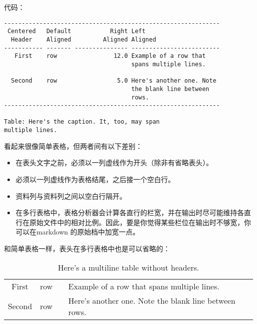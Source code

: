 \documentclass[fancyhdr,bookmark]{ctexbook}
\providecommand{\tightlist}{%
  \setlength{\itemsep}{0pt}\setlength{\parskip}{0pt}}
\begin{document}
代码：

\begin{lstlisting}
-------------------------------------------------------------
 Centered   Default           Right Left
  Header    Aligned         Aligned Aligned
----------- ------- --------------- -------------------------
   First    row                12.0 Example of a row that
                                    spans multiple lines.

  Second    row                 5.0 Here's another one. Note
                                    the blank line between
                                    rows.
-------------------------------------------------------------

Table: Here's the caption. It, too, may span
multiple lines.
\end{lstlisting}

看起来很像简单表格，但两者间有以下差别：

\begin{itemize}
\tightlist
\item
  在表头文字之前，必须以一列虚线作为开头（除非有省略表头）。
\item
  必须以一列虚线作为表格结尾，之后接一个空白行。
\item
  资料列与资料列之间以空白行隔开。
\item
  在多行表格中，表格分析器会计算各直行的栏宽，并在输出时尽可能维持各直行在原始文件中的相对比例。因此，要是你觉得某些栏位在输出时不够宽，你可以在markdown
  的原始档中加宽一点。
\end{itemize}

和简单表格一样，表头在多行表格中也是可以省略的：

\begin{longtable}[]{@{}clrl@{}}
\caption{Here's a multiline table without headers.}\tabularnewline
\toprule
\endhead
\begin{minipage}[t]{0.15\columnwidth}\centering
First\strut
\end{minipage} & \begin{minipage}[t]{0.10\columnwidth}\raggedright
row\strut
\end{minipage} & \begin{minipage}[t]{0.20\columnwidth}\raggedleft
12.0\strut
\end{minipage} & \begin{minipage}[t]{0.32\columnwidth}\raggedright
Example of a row that spans multiple lines.\strut
\end{minipage}\tabularnewline
\begin{minipage}[t]{0.15\columnwidth}\centering
Second\strut
\end{minipage} & \begin{minipage}[t]{0.10\columnwidth}\raggedright
row\strut
\end{minipage} & \begin{minipage}[t]{0.20\columnwidth}\raggedleft
5.0\strut
\end{minipage} & \begin{minipage}[t]{0.32\columnwidth}\raggedright
Here's another one. Note the blank line between rows.\strut
\end{minipage}\tabularnewline
\bottomrule
\end{longtable}
\end{document}
